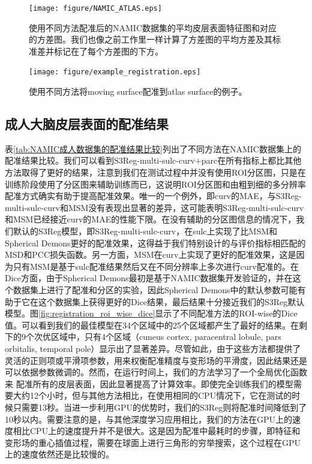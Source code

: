 \begin{figure}[h]
	\centering
	\texttt{[image: figure/NAMIC\_ATLAS.eps]}
	\caption{使用不同方法配准后的NAMIC数据集的平均皮层表面特征图和对应的方差图。我们也像之前工作\cite{lyu2019hierarchical}里一样计算了方差图的平均方差及其标准差并标记在了每个方差图的下方。}
	\label{fig:NAMIC_ATLAS}
\end{figure}

\begin{figure}[h]
	\centering
	\texttt{[image: figure/example\_registration.eps]}
	\caption{使用不同方法将moving surface配准到atlas surface的例子。}
	\label{fig:example_registration}
\end{figure}

\subsection{成人大脑皮层表面的配准结果}
表\ref{tab:NAMIC成人数据集的配准结果比较}列出了不同方法在NAMIC数据集上的配准结果比较。我们可以看到S3Reg-multi-sulc-curv+parc在所有指标上都比其他方法取得了更好的结果，注意到我们在测试过程中并没有使用ROI分区图，只是在训练阶段使用了分区图来辅助训练而已，这说明ROI分区图和由粗到细的多分辨率配准方式确实有助于提高配准效果。唯一的一个例外，即curv的MAE，与S3Reg-multi-sulc-curv和MSM没有表现出显著的差异，这可能表明S3Reg-multi-sulc-curv和MSM已经接近curv的MAE的性能下限。在没有辅助的分区图信息的情况下，我们默认的S3Reg模型，即S3Reg-multi-sulc-curv，在sulc上实现了比MSM和Spherical Demons更好的配准效果，这得益于我们特别设计的与评价指标相匹配的MSD和PCC损失函数。另一方面，MSM在curv上实现了更好的配准效果，这是因为只有MSM是基于sulc配准结果然后又在不同分辨率上多次进行curv配准的。在Dice方面，由于Spherical Demons最初是基于NAMIC数据集开发验证的，并在这个数据集上进行了配准和分区的实验，因此Spherical Demons中的默认参数可能有助于它在这个数据集上获得更好的Dice结果，最后结果十分接近我们的S3Reg默认模型。图\ref{fig:registration_roi_wise_dice}显示了不同配准方法的ROI-wise的Dice值。可以看到我们的最佳模型在34个区域中的25个区域都产生了最好的结果。在剩下的9个次优区域中，只有4个区域（cuneus cortex, paracentral lobule, pars orbitalis, temporal pole）显示出了显著差异。尽管如此，由于这些方法都提供了灵活的正则项或平滑项参数，用来权衡配准精度与变形场的平滑度，因此结果还是可以依据参数微调的。然而，在运行时间上，我们的方法学习了一个全局优化函数来
配准所有的皮层表面，因此显著提高了计算效率。即使完全训练我们的模型需要大约12个小时，但与其他方法相比，在使用相同的CPU情况下，它在测试的时候只需要13秒。当进一步利用GPU的优势时，我们的S3Reg则将配准时间降低到了10秒以内。需要注意的是，与其他深度学习应用相比，我们的方法在GPU上的速度相比CPU上的速度提升并不是很大。这是因为配准中最耗时的步骤，即特征和变形场的重心插值过程，需要在球面上进行三角形的穷举搜索，这个过程在GPU上的速度依然还是比较慢的。


